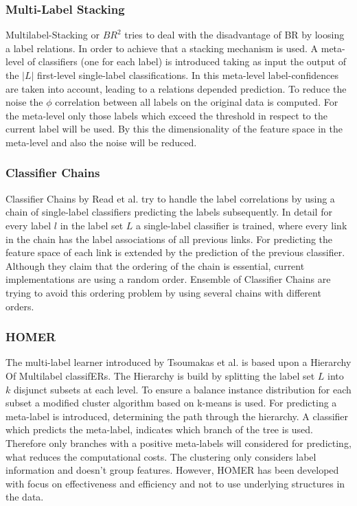 \subsubsection{Multi-Label Stacking}
Multilabel-Stacking or $ BR^2 $ tries to deal with the disadvantage of BR by loosing a label relations\cite{Tsoumakas09}. In order to achieve that a stacking mechanism is used. A meta-level of classifiers (one for each label) is introduced taking as input the output of the $ |L| $ first-level single-label classifications. In this meta-level label-confidences are taken into account, leading to a relations depended prediction. To reduce the noise the $\phi$ correlation between all labels on the original data is computed. For the meta-level only those labels which exceed the threshold in respect to the current label will be used. By this the dimensionality of the feature space in the meta-level and also the noise will be reduced.
\subsubsection{Classifier Chains}
Classifier Chains by Read et al.\cite{Read09} try to handle the label correlations by using a chain of single-label classifiers predicting the labels subsequently. In detail for every label $ l $ in the label set $ L $ a single-label classifier is trained, where every link in the chain has the label associations of all previous links. For predicting the feature space of each link is extended by the prediction of the previous classifier. Although they claim that the ordering of the chain is essential, current implementations are using a random order. Ensemble of Classifier Chains are trying to avoid this ordering problem by using several chains with different orders.
\subsubsection{HOMER}
The multi-label learner introduced by Tsoumakas et al.\cite{Tsoumakas07_2} is based upon a Hierarchy Of Multilabel classifERs. The Hierarchy is build by splitting the label set $ L $ into $k$ disjunct subsets at each level. To ensure a balance instance distribution for each subset a modified cluster algorithm based on k-means is used. For predicting a meta-label is introduced, determining the path through the hierarchy. A classifier which predicts the meta-label, indicates which branch of the tree is used. Therefore only branches with a positive meta-labels will considered for predicting, what reduces the computational costs.
The clustering only considers label information and doesn't group features. However, HOMER has been developed with focus on effectiveness and efficiency and not to use underlying structures in the data.

